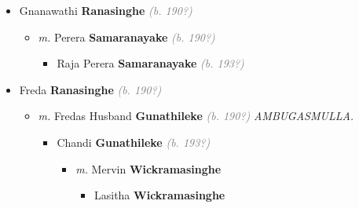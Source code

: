 \documentclass[10pt, openany]{book}
\begin{document}
\begin{itemize}
{\begin{itemize}
{\begin{itemize}
{\begin{itemize}
{\begin{itemize}
{\begin{itemize}
{\begin{itemize}
{\begin{itemize}
\item{Chishanthi \textbf{Weerakone} \textcolor{gray}{\textit{(b. 198?)}}
 }
\item{Dunchi \textbf{Weerakone} \textcolor{gray}{\textit{(b. 198?)}}
 }
\item{Shanaka \textbf{Weerakone} \textcolor{gray}{\textit{(b. 198?)}}
 }
\end{itemize}}
\end{itemize}
 }
\end{itemize}}
\end{itemize}
 }
\item{Gnanawathi \textbf{Ranasinghe} \textcolor{gray}{\textit{(b. 190?)}}
\begin{itemize}
\item{\textit{m.} Perera \textbf{Samaranayake} \textcolor{gray}{\textit{(b. 190?)}}   \label{couple:00000628:00000684} \begin{itemize}
\item{Raja Perera \textbf{Samaranayake} \textcolor{gray}{\textit{(b. 193?)}}
  }
\end{itemize}}
\end{itemize}
 }
\item{Freda \textbf{Ranasinghe} \textcolor{gray}{\textit{(b. 190?)}}
\begin{itemize}
\item{\textit{m.} Fredas Husband \textbf{Gunathileke} \textcolor{gray}{\textit{(b. 190?)}} \textcolor{slmaroon}{\textit{AMBUGASMULLA.}}   \label{couple:00000232:00000627} \begin{itemize}
\item{Chandi \textbf{Gunathileke} \textcolor{gray}{\textit{(b. 193?)}}
\begin{itemize}
\item{\textit{m.} Mervin \textbf{Wickramasinghe} \textcolor{slorange}{\textit{}}   \label{couple:00000231:00000980} \begin{itemize}
\item{Lasitha \textbf{Wickramasinghe} \textcolor{slorange}{\textit{}}
 }
\end{itemize}}
\end{itemize}
 }
\end{itemize}}
\end{itemize}
 }
\end{itemize}}
\end{itemize}
 }
\end{itemize}}
\end{itemize}
   
\end{document}
